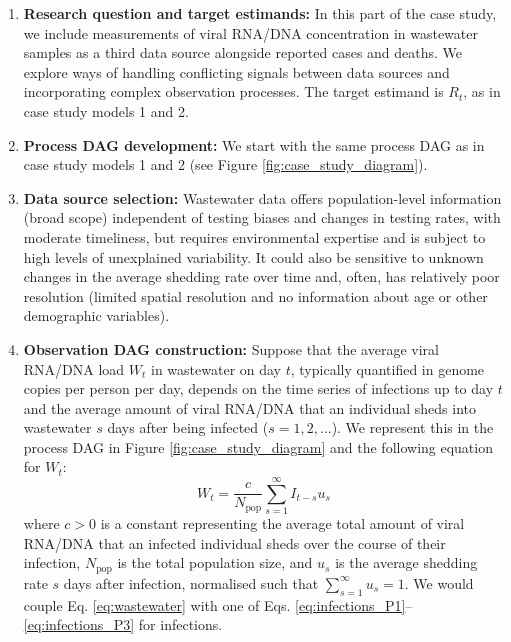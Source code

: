 \documentclass{article}
\begin{document}
\begin{enumerate}
   \item \textbf{Research question and target estimands:} In this part of the case study, we include measurements of viral \ac{RNA}/\ac{DNA} concentration in wastewater samples as a third data source alongside reported cases and deaths. We explore ways of handling conflicting signals between data sources and incorporating complex observation processes. The target estimand is $R_t$, as in case study models 1 and 2.
   
    \item \textbf{Process DAG development:} We start with the same process \ac{DAG} as in case study models 1 and 2 (see Figure \ref{fig:case_study_diagram}).

    \item \textbf{Data source selection:} Wastewater data offers population-level information (broad scope) independent of testing biases and changes in testing rates, with moderate timeliness, but requires environmental expertise and is subject to high levels of unexplained variability. It could also be sensitive to unknown changes in the average shedding rate over time and, often, has relatively poor resolution (limited spatial resolution and no information about age or other demographic variables). 

    
    \item \textbf{Observation DAG construction:} 
    Suppose that the average viral \ac{RNA}/\ac{DNA} load $W_t$ in wastewater on day $t$, typically quantified in genome copies per person per day, depends on the time series of infections up to day $t$ and the average amount of viral \ac{RNA}/\ac{DNA} that an individual sheds into wastewater $s$ days after being infected ($s=1,2,\ldots$). We represent this in the process \ac{DAG} in Figure \ref{fig:case_study_diagram} and the following equation for $W_t$:
    \begin{equation} \label{eq:wastewater}
        W_t = \frac{c}{N_\mathrm{pop}}\sum_{s=1}^\infty I_{t-s}u_s 
    \end{equation}
    where $c>0$ is a constant representing the average total amount of viral \ac{RNA}/\ac{DNA} that an infected individual sheds over the course of their infection, $N_\mathrm{pop}$ is the total population size, and $u_s$ is the average shedding rate $s$ days after infection, normalised such that $\sum_{s=1}^\infty u_s=1$. We would couple Eq. \eqref{eq:wastewater} with one of Eqs. \eqref{eq:infections_P1}--\eqref{eq:infections_P3} for infections.
    

\end{enumerate}
\end{document}
